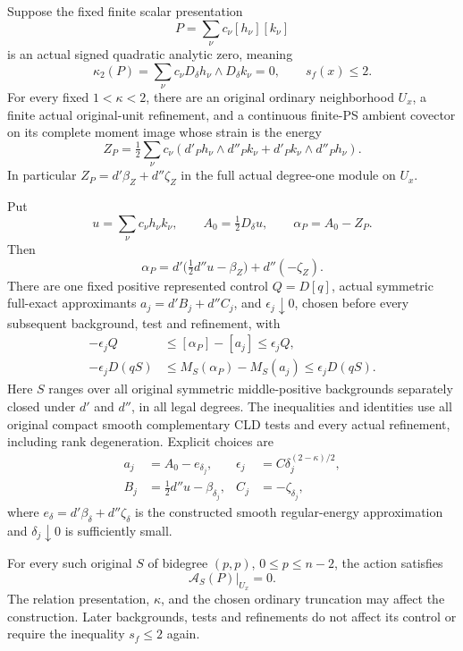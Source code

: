 \begin{theorem}
\label{thm:r11-ordinary-quadratic-residue-two}
Suppose the fixed finite scalar presentation
\[
                    P=\sum_\nu c_\nu[h_\nu][k_\nu]
\tag{OR2}
\]
is an actual signed quadratic analytic zero, meaning
\[
             \kappa_2(P)=\sum_\nu c_\nu
                 D_\delta h_\nu\wedge D_\delta k_\nu=0,
                    \qquad s_f(x)\le2.
\tag{OR3}
\]
For every fixed \(1<\kappa<2\), there are an original ordinary
neighborhood \(U_x\), a finite actual original-unit refinement,
and a continuous finite-PS ambient covector on its complete moment
image whose strain is the energy
\[
 Z_P=\tfrac12\sum_\nu c_\nu
       (d'_Ph_\nu\wedge d''_Pk_\nu+
                         d'_Pk_\nu\wedge d''_Ph_\nu).
\tag{OR4}
\]
In particular \(Z_P=d'\beta_Z+d''\zeta_Z\) in the full actual
degree-one module on \(U_x\).

Put
\[
 u=\sum_\nu c_\nu h_\nu k_\nu,\qquad
 A_0=\tfrac12D_\delta u,\qquad \alpha_P=A_0-Z_P.
\tag{OR5}
\]
Then
\[
 \alpha_P=d'\bigl(\tfrac12d''u-\beta_Z\bigr)+d''(-\zeta_Z).
\tag{OR6}
\]
There are one fixed positive represented control \(Q=D[q]\),
actual symmetric full-exact approximants
\(a_j=d'B_j+d''C_j\), and \(\epsilon_j\downarrow0\),
chosen before every subsequent background, test and refinement,
with
\[
\begin{aligned}
 -\epsilon_jQ&\le[\alpha_P]-[a_j]\le\epsilon_jQ,\\
 -\epsilon_jD(qS)&\le M_S(\alpha_P)-M_S(a_j)
                                      \le\epsilon_jD(qS).
\end{aligned}
\tag{OR7}
\]
Here \(S\) ranges over all original symmetric middle-positive
backgrounds separately closed under \(d'\) and \(d''\), in all
legal degrees. The inequalities and identities use all original
compact smooth complementary CLD tests and every actual refinement,
including rank degeneration. Explicit choices are
\[
\begin{aligned}
 a_j&=A_0-e_{\delta_j},&
 \epsilon_j&=C\delta_j^{(2-\kappa)/2},\\
 B_j&=\tfrac12d''u-\beta_{\delta_j},&
 C_j&=-\zeta_{\delta_j},
\end{aligned}
\tag{OR8}
\]
where \(e_\delta=d'\beta_\delta+d''\zeta_\delta\) is the
constructed smooth regular-energy approximation and
\(\delta_j\downarrow0\) is sufficiently small.

For every such original \(S\) of bidegree \((p,p)\),
\(0\le p\le n-2\), the action satisfies
\[
                         \mathcal A_S(P)|_{U_x}=0.
\tag{OR9}
\]
The relation presentation, \(\kappa\), and the chosen ordinary
truncation may affect the construction. Later backgrounds, tests
and refinements do not affect its control or require the inequality
\(s_f\le2\) again.
\end{theorem}

